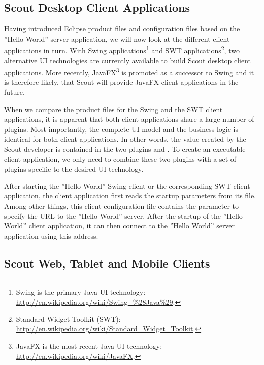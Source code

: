 \documentclass[a4paper,10pt,twoside]{book}
\begin{document}
\subsection{Scout Desktop Client Applications}

Having introduced Eclipse product files and configuration files based on the ''Hello World'' server application, we will now look at the different client applications in turn.
With Swing applications\footnote{
Swing is the primary Java UI technology: \url{http://en.wikipedia.org/wiki/Swing_\%28Java\%29}.
}
and SWT applications\footnote{
Standard Widget Toolkit (SWT): \url{http://en.wikipedia.org/wiki/Standard_Widget_Toolkit}.
}, two alternative UI technologies are currently available to build Scout desktop client applications.
More recently, JavaFX\footnote{
JavaFX is the most recent Java UI technology: \url{http://en.wikipedia.org/wiki/JavaFX}.
} 
is promoted as a successor to Swing and it is therefore likely, that Scout will provide JavaFX client applications in the future.

When we compare the product files for the Swing and the SWT client applications, it is apparent that both client applications share a large number of plugins.
Most importantly, the complete UI model and the business logic is identical for both client applications.
In other words, the value created by the Scout developer is contained in the two plugins  and .
To create an executable client application, we only need to combine these two plugins with a set of plugins specific to the desired UI technology.

After starting the ''Hello World'' Swing client or the corresponding SWT client application, the client application first reads the startup parameters from its  file.
Among other things, this client configuration file contains the parameter  to specify the URL to the ''Hello World'' server. 
After the startup of the ''Hello World'' client application, it can then connect to the ''Hello World'' server application using this address.

\subsection{Scout Web, Tablet and Mobile Clients}
\end{document}
